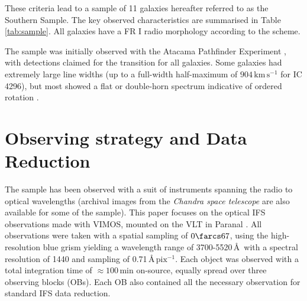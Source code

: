 \documentclass[a4paper,fleqn,usenatbib]{mnras}
\begin{document}
\begin{table}
\begin{tabular}{l c c c c l}
			\hline
			\hline
		\end{tabular}
	\end{table}

	These criteria lead to a sample of 11 galaxies hereafter referred to as the Southern Sample. The key observed characteristics are summarised in Table \ref{tab:sample}. All galaxies have a FR I radio morphology according to the \citet{Fanaroff1974} scheme. 
	
	The sample was initially observed with the Atacama Pathfinder Experiment \citep[APEX; ][]{Gusten2006}, with detections claimed for the  transition for all galaxies. Some galaxies had extremely large line widths (up to a full-width half-maximum of $904 \, \mathrm{km \, s^{-1}}$ for IC 4296), but most showed a flat or double-horn spectrum indicative of ordered rotation \citep{Prandoni2012}.

\section{Observing strategy and Data Reduction}
	\label{sec:obs}
	The sample has been observed with a suit of instruments spanning the radio to optical wavelengths (archival images from the \textit{Chandra space telescope} are also available for some of the sample). This paper focuses on the optical IFS observations made with VIMOS, mounted on the VLT in Paranal \citep{LeFevre2003}. All observations were taken with a spatial sampling of $0\farcs67$, using the high-resolution blue grism yielding a wavelength range of 3700-5520\,\AA\ with a spectral resolution of 1440 and sampling of 0.71\,\AA\,$\mathrm{pix^{-1}}$. Each object was observed with a total integration time of $\approx 100$\,min on-source, equally spread over three observing blocks (OBs). Each OB also contained all the necessary observation for standard IFS data reduction. 
\end{document}
